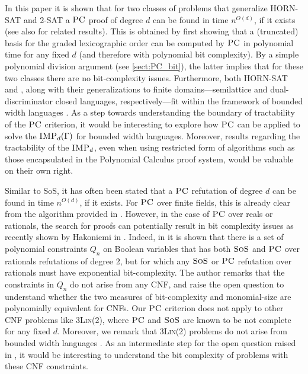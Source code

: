 \documentclass[11pt]{article}
\newcommand{\sos}{\text{\sc{SoS}}}
\newcommand{\IMP}{\textsc{IMP}}
\newcommand{\PC}{\textsc{PC}}
\newcommand{\1}{\textbf{1}}
\newcommand{\GB}{\text{Gr\"{o}bner} }
\begin{document}
In this paper it is shown that for two classes of problems that generalize \textsc{HORN-SAT} and \textsc{2-SAT} a $\PC$ proof of degree $d$ can be found in time $n^{O(d)}$, if it exists (see also \cite{BharathiM21} for related results). This is obtained by first showing that a (truncated) \GB basis for the graded lexicographic order can be computed by $\PC$ in polynomial time for any fixed $d$ (and therefore with polynomial bit complexity). By a simple polynomial division argument (see \cref{sect:PC_bit}), the latter implies that for these two classes there are no bit-complexity issues. Furthermore, both \textsc{HORN-SAT} and , along with their generalizations to finite domains---semilattice and dual-discriminator closed languages, respectively---fit within the framework of bounded width languages \cite{JEAVONS_TRACTABLE_CONSTRAINTS}. As a step towards understanding the boundary of tractability of the $\PC$ criterion, it would be interesting to explore how $\PC$ can be applied to solve the $\IMP_d(\Gamma)$ for bounded width languages. Moreover, results regarding the tractability of the $\IMP_d$, even when using restricted form of algorithms such as those encapsulated in the Polynomial Calculus proof system, would be valuable on their own right.

Similar to SoS, it has often been stated that a $\PC$ refutation of degree $d$ can be found in time $n^{O(d)}$, if it exists. For $\PC$ over finite fields, this is already clear from the algorithm provided in \cite{CleggEI96}. However, in the case of $\PC$ over reals or rationals, the search for proofs can potentially result in bit complexity issues as recently shown by Hakoniemi in \cite{Hakoniemi21}. Indeed, in \cite{Hakoniemi21} it is shown that there is a set of polynomial constraints $Q_n$ on Boolean variables that has both $\sos$ and $\PC$ over rationals refutations of degree 2, but for which any $\sos$ or $\PC$ refutation over rationals must have exponential bit-complexity. The author remarks that the constraints in $Q_n$ do not arise from any CNF, and raise the open question to understand whether the
two measures of bit-complexity and monomial-size are polynomially equivalent for CNFs. Our $\PC$ criterion does not apply to other CNF problems like \textsc{3Lin(2)}, where $\PC$ and $\sos$ are known to be not complete for any fixed $d$. Moreover, we remark that \textsc{3Lin(2)} problems do not arise from bounded width languages \cite{BartoK14}.
As an intermediate step for the open question raised in \cite{Hakoniemi21}, it would be interesting to understand the bit complexity of problems with these CNF constraints.
\end{document}
